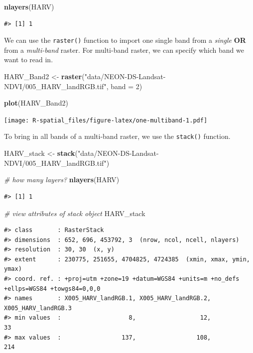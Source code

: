 \documentclass[]{book}
\newenvironment{Shaded}{\begin{snugshade}}{\end{snugshade}}
\newcommand{\KeywordTok}[1]{\textcolor[rgb]{0.13,0.29,0.53}{\textbf{#1}}}
\newcommand{\DataTypeTok}[1]{\textcolor[rgb]{0.13,0.29,0.53}{#1}}
\newcommand{\DecValTok}[1]{\textcolor[rgb]{0.00,0.00,0.81}{#1}}
\newcommand{\StringTok}[1]{\textcolor[rgb]{0.31,0.60,0.02}{#1}}
\newcommand{\CommentTok}[1]{\textcolor[rgb]{0.56,0.35,0.01}{\textit{#1}}}
\newcommand{\NormalTok}[1]{#1}
\theoremstyle{definition}
\theoremstyle{definition}
\theoremstyle{definition}
\theoremstyle{remark}
\begin{document}
\begin{Shaded}
\begin{Highlighting}[]
\KeywordTok{nlayers}\NormalTok{(HARV)}
\end{Highlighting}
\end{Shaded}

\begin{verbatim}
#> [1] 1
\end{verbatim}

We can use the \texttt{raster()} function to import one single band from
a \emph{single} \textbf{OR} from a \emph{multi-band} raster. For
multi-band raster, we can specify which band we want to read in.

\begin{Shaded}
\begin{Highlighting}[]
\NormalTok{HARV_Band2 <-}
\StringTok{  }\KeywordTok{raster}\NormalTok{(}\StringTok{"data/NEON-DS-Landsat-NDVI/005_HARV_landRGB.tif"}\NormalTok{, }\DataTypeTok{band =} \DecValTok{2}\NormalTok{)}

\KeywordTok{plot}\NormalTok{(HARV_Band2)}
\end{Highlighting}
\end{Shaded}

\texttt{[image: R-spatial\_files/figure-latex/one-multiband-1.pdf]}

To bring in all bands of a multi-band raster, we use the
\texttt{stack()} function.

\begin{Shaded}
\begin{Highlighting}[]
\NormalTok{HARV_stack <-}
\StringTok{  }\KeywordTok{stack}\NormalTok{(}\StringTok{"data/NEON-DS-Landsat-NDVI/005_HARV_landRGB.tif"}\NormalTok{)}

\CommentTok{# how many layers?}
\KeywordTok{nlayers}\NormalTok{(HARV)}
\end{Highlighting}
\end{Shaded}

\begin{verbatim}
#> [1] 1
\end{verbatim}

\begin{Shaded}
\begin{Highlighting}[]
\CommentTok{# view attributes of stack object}
\NormalTok{HARV_stack}
\end{Highlighting}
\end{Shaded}

\begin{verbatim}
#> class       : RasterStack 
#> dimensions  : 652, 696, 453792, 3  (nrow, ncol, ncell, nlayers)
#> resolution  : 30, 30  (x, y)
#> extent      : 230775, 251655, 4704825, 4724385  (xmin, xmax, ymin, ymax)
#> coord. ref. : +proj=utm +zone=19 +datum=WGS84 +units=m +no_defs +ellps=WGS84 +towgs84=0,0,0 
#> names       : X005_HARV_landRGB.1, X005_HARV_landRGB.2, X005_HARV_landRGB.3 
#> min values  :                   8,                  12,                  33 
#> max values  :                 137,                 108,                 214
\end{verbatim}
\end{document}
